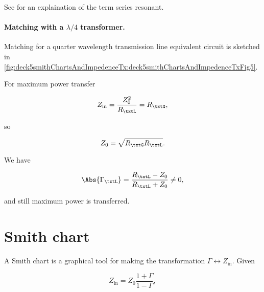 See \citep{seriesResonance} for an explaination of the term series resonant.

\paragraph{Matching with a \( \lambda/4 \) transformer.}

Matching for a quarter wavelength transmission line equivalent circuit is sketched in \cref{fig:deck5smithChartsAndImpedenceTx:deck5smithChartsAndImpedenceTxFig5}.


For maximum power transfer

\begin{equation}\label{eqn:uwavesDeck5SmithChartCore:300}
Z_{\textrm{in}} = \frac{Z_0^2}{R_\txtL} = R_\txtG, 
\end{equation}

so

\begin{equation}\label{eqn:uwavesDeck5SmithChartCore:320}
Z_0 = \sqrt{ R_\txtG R_\txtL }.
\end{equation}

We have

\begin{equation}\label{eqn:uwavesDeck5SmithChartCore:340}
\Abs{\Gamma_\txtL} = \frac{ R_\txtL - Z_0 }{R_\txtL + Z_0} \ne 0,
\end{equation}

and still maximum power is transferred.

\section{Smith chart}

A Smith chart is a graphical tool for making the transformation \( \Gamma \leftrightarrow Z_{\textrm{in}} \).  Given

\begin{equation}\label{eqn:uwavesDeck5SmithChartCore:360}
Z_{\textrm{in}} = Z_0 \frac{ 1 + \Gamma }{ 1 - \Gamma },
\end{equation}

